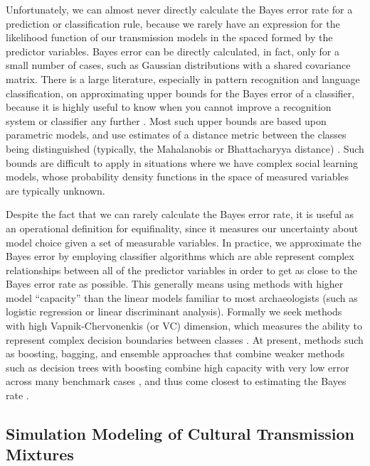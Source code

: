 Unfortunately, we can almost never directly calculate the Bayes error
rate for a prediction or classification rule, because we rarely have an
expression for the likelihood function of our transmission models in the
spaced formed by the predictor variables. Bayes error can be directly calculated, in fact, only for
a small number of cases, such as Gaussian distributions with a shared
covariance
matrix.  There is a large literature, especially in pattern recognition and language classification, on approximating upper bounds for the Bayes error of a classifier, because it is highly useful to know when you cannot improve a recognition system or classifier any further \citep{Antos:1999dn, Dobbin:2009du, McLachlan:1975eo}.  Most such upper bounds are based upon parametric models, and use estimates of a distance metric between the classes being distinguished (typically, the Mahalanobis or Bhattacharyya distance) \citep{devijver1982pattern}.  Such bounds are difficult to apply in situations where we have complex social learning models, whose probability density functions in the space of measured variables are typically unknown.  

Despite the fact that we can rarely calculate the Bayes error rate, it
is useful as an operational definition for equifinality, since it
measures our uncertainty about model choice given a set of measurable
variables. In practice, we approximate the Bayes error by employing classifier algorithms which are able represent complex relationships between all of the predictor variables in order to get as close to the Bayes error rate as possible.  This generally means using methods with higher model ``capacity'' than the linear models familiar to most archaeologists (such as logistic regression or linear discriminant analysis).  Formally we seek methods with high Vapnik-Chervonenkis (or VC) dimension, which measures the ability to represent complex decision boundaries between classes \citep{vapnik2013nature}.  At present, methods such as boosting, bagging, and ensemble approaches that combine weaker methods such as decision trees with boosting combine high capacity with very low error across many benchmark cases \citep{hastie2009elements}, and thus come closest to estimating the
Bayes rate \citep{tumer2003bayes}.  

\subsection{Simulation Modeling of Cultural Transmission Mixtures}\label{ctmixtures:sec:ct-mixture-modeling}

